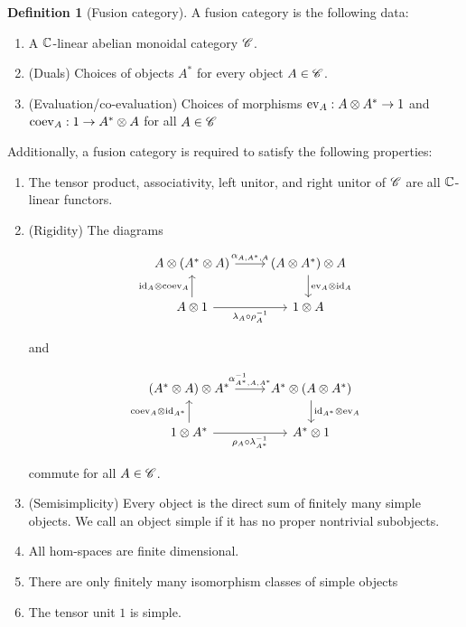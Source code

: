 \documentclass{article}
\theoremstyle{definition}
\newtheorem*{definition}{Definition}
\numberwithin{figure}{section}
\begin{document}
\begin{definition}[Fusion category] A fusion category is the following data:

\begin{enumerate}
\item A $\mathbb{C}$-linear abelian monoidal category $\mathscr{C}$.
\item (Duals) Choices of objects $A^*$ for every object $A\in \mathscr{C}$.
\item (Evaluation/co-evaluation) Choices of morphisms $\mathrm{ev}_A: A\otimes A^*\to 1$ and $\mathrm{coev}_A: 1\to A^*\otimes A$ for all $A\in \mathscr{C}$
\end{enumerate}

Additionally, a fusion category is required to satisfy the following properties:

\begin{enumerate}
\item The tensor product, associativity, left unitor, and right unitor of $\mathscr{C}$ are all $\mathbb{C}$-linear functors.
\item (Rigidity) The diagrams

\[\begin{tikzcd}
	{A\otimes (A^*\otimes A)} & {(A\otimes A^*)\otimes A} \\
	{A\otimes 1} & {1\otimes A}
	\arrow["{\alpha_{A,A^*,A}}", from=1-1, to=1-2]
	\arrow["{\ev_{A}\otimes \id_A}", from=1-2, to=2-2]
	\arrow["{\id_{A}\otimes \coev_{A}}", from=2-1, to=1-1]
	\arrow["{\lambda_A\circ\rho^{-1}_{A}}"', from=2-1, to=2-2]
\end{tikzcd}\]

and

\[\begin{tikzcd}
	{(A^*\otimes A)\otimes A^*} & {A^*\otimes (A\otimes A^*)} \\
	{1\otimes A^*} & {A^*\otimes 1}
	\arrow["{\alpha^{-1}_{A^*,A,A^*}}", from=1-1, to=1-2]
	\arrow["{\coev_{A}\otimes \id_{A^*}}", from=2-1, to=1-1]
	\arrow["{\id_{A^*}\otimes \ev_{A}}", from=1-2, to=2-2]
	\arrow["{\rho_A\circ\lambda^{-1}_{A^*}}"', from=2-1, to=2-2]
\end{tikzcd}\]

commute for all $A\in \mathscr{C}$.

\item (Semisimplicity) Every object is the direct sum of finitely many simple objects. We call an object simple if it has no proper nontrivial subobjects.
\item All hom-spaces are finite dimensional.
\item There are only finitely many isomorphism classes of simple objects
\item The tensor unit $1$ is simple.
\end{enumerate}
\raggedleft\qedsymbol{}
\end{definition}
\end{document}
